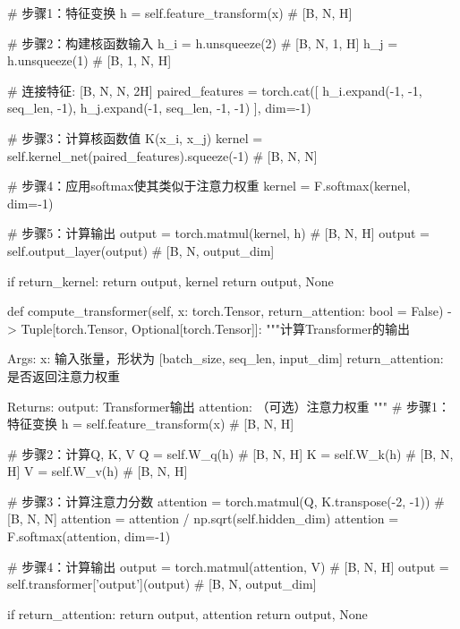 \documentclass{MMCStyle}
\begin{document}
\begin{python}
        # 步骤1：特征变换
        h = self.feature_transform(x)  # [B, N, H]
        
        # 步骤2：构建核函数输入
        h_i = h.unsqueeze(2)  # [B, N, 1, H]
        h_j = h.unsqueeze(1)  # [B, 1, N, H]
        
        # 连接特征: [B, N, N, 2H]
        paired_features = torch.cat([
            h_i.expand(-1, -1, seq_len, -1),
            h_j.expand(-1, seq_len, -1, -1)
        ], dim=-1)
        
        # 步骤3：计算核函数值 K(x_i, x_j)
        kernel = self.kernel_net(paired_features).squeeze(-1)  # [B, N, N]
        
        # 步骤4：应用softmax使其类似于注意力权重
        kernel = F.softmax(kernel, dim=-1)
        
        # 步骤5：计算输出
        output = torch.matmul(kernel, h)  # [B, N, H]
        output = self.output_layer(output)  # [B, N, output_dim]
        
        if return_kernel:
            return output, kernel
        return output, None
    
    def compute_transformer(self, x: torch.Tensor,
                          return_attention: bool = False) -> Tuple[torch.Tensor, Optional[torch.Tensor]]:
        """计算Transformer的输出
        
        Args:
            x: 输入张量，形状为 [batch_size, seq_len, input_dim]
            return_attention: 是否返回注意力权重
            
        Returns:
            output: Transformer输出
            attention: （可选）注意力权重
        """
        # 步骤1：特征变换
        h = self.feature_transform(x)  # [B, N, H]
        
        # 步骤2：计算Q, K, V
        Q = self.W_q(h)  # [B, N, H]
        K = self.W_k(h)  # [B, N, H]
        V = self.W_v(h)  # [B, N, H]
        
        # 步骤3：计算注意力分数
        attention = torch.matmul(Q, K.transpose(-2, -1))  # [B, N, N]
        attention = attention / np.sqrt(self.hidden_dim)
        attention = F.softmax(attention, dim=-1)
        
        # 步骤4：计算输出
        output = torch.matmul(attention, V)  # [B, N, H]
        output = self.transformer['output'](output)  # [B, N, output_dim]
        
        if return_attention:
            return output, attention
        return output, None
    

\end{python}
\end{document}
